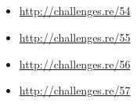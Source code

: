 \subsection{\Exercises}

\begin{itemize}
	\item \url{http://challenges.re/54}
	\item \url{http://challenges.re/55}
	\item \url{http://challenges.re/56}
	\item \url{http://challenges.re/57}
\end{itemize}

